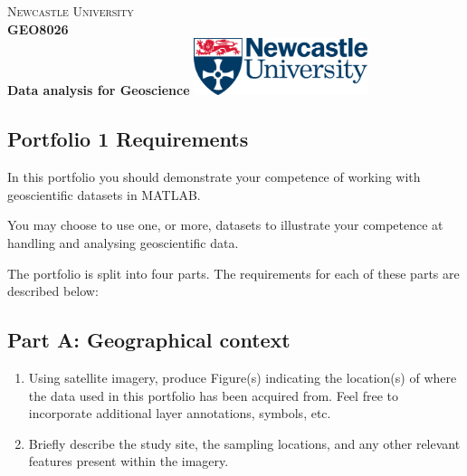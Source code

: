 \documentclass[11pt,onecolumn,a4paper,notitlepage]{article}
\begin{document}


\begin{tcolorbox}[ halign upper=flush center] %
	\large \textsc{Newcastle University}
	\vspace{0.25cm}
	\\
	{\huge {\textbf{GEO8026}}}
	\\
	\vspace{0.25cm}
	\textbf{Data analysis for Geoscience}
	\tcblower  %
	\includegraphics[width=2in]{logo.png}
\end{tcolorbox}

\noindent\makebox[\linewidth]{\rule{\textwidth}{0.4pt}} 

\begin{center}
\section*{Portfolio 1 Requirements}
\end{center}

\noindent
In this portfolio you should demonstrate your competence of working with geoscientific datasets in MATLAB. 
\bigskip

\noindent You may choose to use one, or more, datasets to illustrate your competence at handling and analysing geoscientific data.
\bigskip

\noindent The portfolio is split into four parts. The requirements for each of these parts are described below:
\bigskip

\subsection*{Part A: Geographical context}

\begin{enumerate}
\item Using satellite imagery, produce Figure(s) indicating the location(s) of where the data used in this portfolio has been acquired from. Feel free to incorporate additional layer annotations, symbols, etc.
\item Briefly describe the study site, the sampling locations, and any other relevant features present within the imagery.
\end{enumerate}
\end{document}
